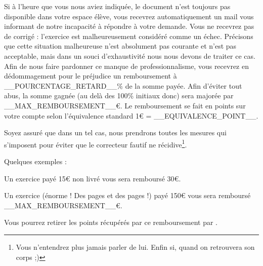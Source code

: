 ﻿Si à l'heure que vous nous aviez indiquée, le document n'est toujours pas disponible dans votre espace élève, vous recevrez automatiquement un mail vous informant de notre incapacité à répondre à votre demande. Vous ne recevrez \b{pas} de corrigé : l'exercice est malheureusement considéré comme un échec. Précisons que cette situation malheureuse n'est absolument pas courante et n'est pas acceptable, mais dans un souci d'exhaustivité nous nous devons de traiter ce cas.
Afin de nous faire pardonner ce manque de professionnalisme, vous recevrez en dédommagement pour le préjudice un remboursement à __POURCENTAGE_RETARD__\% de la somme payée. Afin d'éviter tout abus, la somme gagnée (au delà des 100\% initiaux donc) sera majorée par __MAX_REMBOURSEMENT__€. Le remboursement se fait en points sur votre compte selon l'équivalence standard 1€ = __EQUIVALENCE_POINT__.

Soyez assuré que dans un tel cas, nous prendrons toutes les mesures qui s'imposent pour éviter que le correcteur fautif ne récidive\footnote{Vous n'entendrez plus jamais parler de lui. Enfin si, quand on retrouvera son corps ;)}.

Quelques exemples :
\item Un exercice payé 15€ non livré vous sera remboursé 30€.
\item Un exercice (énorme ! Des pages et des pages !) payé 150€ vous sera remboursé __MAX_REMBOURSEMENT__€.

Vous pourrez retirer les points récupérés par ce remboursement par .